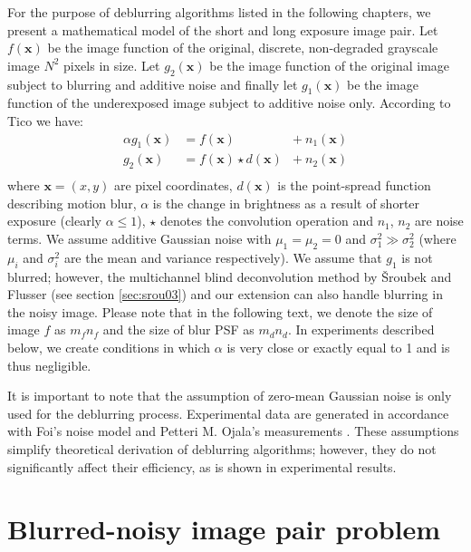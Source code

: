 \documentclass[12pt,notitlepage]{report}
\begin{document}
For the purpose of deblurring algorithms listed in the following chapters, we present a mathematical model of the short and long exposure image pair. Let $f(\mathbf{x})$ be the image function of the original, discrete, non-degraded grayscale image $N^2$ pixels in size. Let $g_2(\mathbf{x})$ be the image function of the original image subject to blurring and additive noise  and finally let $g_1(\mathbf{x})$ be the image function of the underexposed image subject to additive noise only. According to Tico \cite{tico06} we have:
\begin{equation}
	\label{eq:general_model}
	\begin{aligned}
		\alpha g_1(\mathbf{x}) &= f(\mathbf{x}) &+ \ n_1(\mathbf{x}) \\
		g_2(\mathbf{x}) &= f(\mathbf{x}) \star d(\mathbf{x}) &+ \ n_2(\mathbf{x}) \\
	\end{aligned}
\end{equation}
where $\mathbf{x}=(x,y)$ are pixel coordinates, $d(\mathbf{x})$ is the point-spread function describing motion blur, $\alpha$ is the change in brightness as a result of shorter exposure (clearly $\alpha \leq 1$), $\star$ denotes the convolution operation and $n_1$, $n_2$ are noise terms. We assume additive Gaussian noise with $\mu_1 = \mu_2 = 0$ and $\sigma_1^2 \gg \sigma_2^2$ (where $\mu_i$ and $\sigma_i^2$ are the mean and variance respectively). We assume that $g_1$ is not blurred; however, the multichannel blind deconvolution method by Šroubek and Flusser (see section \ref{sec:srou03}) and our extension can also handle blurring in the noisy image. Please note that in the following text, we denote the size of image $f$ as $m_f n_f$ and the size of blur PSF as $m_d n_d$. In experiments described below, we create conditions in which $\alpha$ is very close or exactly equal to 1 and is thus negligible.

It is important to note that the assumption of zero-mean Gaussian noise is only used for the deblurring process. Experimental data are generated in accordance with Foi's \cite{foi07} noise model and Petteri M. Ojala's measurements \cite{ojal08}. These assumptions simplify theoretical derivation of deblurring algorithms; however, they do not significantly affect their efficiency, as is shown in experimental results.     

\section{Blurred-noisy image pair problem}
\label{sec:blurred_noisy}
\end{document}
